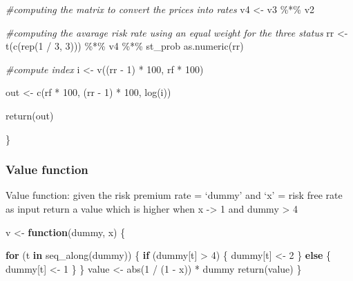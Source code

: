 \documentclass[
]{article}
\newenvironment{Shaded}{\begin{snugshade}}{\end{snugshade}}
\newcommand{\CommentTok}[1]{\textcolor[rgb]{0.56,0.35,0.01}{\textit{#1}}}
\newcommand{\ControlFlowTok}[1]{\textcolor[rgb]{0.13,0.29,0.53}{\textbf{#1}}}
\newcommand{\DecValTok}[1]{\textcolor[rgb]{0.00,0.00,0.81}{#1}}
\newcommand{\FunctionTok}[1]{\textcolor[rgb]{0.00,0.00,0.00}{#1}}
\newcommand{\NormalTok}[1]{#1}
\newcommand{\OtherTok}[1]{\textcolor[rgb]{0.56,0.35,0.01}{#1}}
\newcommand{\SpecialCharTok}[1]{\textcolor[rgb]{0.00,0.00,0.00}{#1}}
\begin{document}
\begin{Shaded}
\begin{Highlighting}[]
    \CommentTok{\#computing the matrix to convert the prices into rates}
\NormalTok{    v4      }\OtherTok{\textless{}{-}}\NormalTok{ v3 }\SpecialCharTok{\%*\%}\NormalTok{ v2}

    \CommentTok{\#computing the avarage risk rate using an equal weight for the three status}
\NormalTok{    rr      }\OtherTok{\textless{}{-}} \FunctionTok{t}\NormalTok{(}\FunctionTok{c}\NormalTok{(}\FunctionTok{rep}\NormalTok{(}\DecValTok{1} \SpecialCharTok{/} \DecValTok{3}\NormalTok{, }\DecValTok{3}\NormalTok{))) }\SpecialCharTok{\%*\%}\NormalTok{ v4 }\SpecialCharTok{\%*\%}\NormalTok{ st\_prob}
    \FunctionTok{as.numeric}\NormalTok{(rr)}

    \CommentTok{\#compute index}
\NormalTok{    i       }\OtherTok{\textless{}{-}} \FunctionTok{v}\NormalTok{((rr }\SpecialCharTok{{-}} \DecValTok{1}\NormalTok{) }\SpecialCharTok{*} \DecValTok{100}\NormalTok{, rf }\SpecialCharTok{*} \DecValTok{100}\NormalTok{)}

\NormalTok{    out     }\OtherTok{\textless{}{-}} \FunctionTok{c}\NormalTok{(rf }\SpecialCharTok{*} \DecValTok{100}\NormalTok{, (rr }\SpecialCharTok{{-}} \DecValTok{1}\NormalTok{) }\SpecialCharTok{*} \DecValTok{100}\NormalTok{, }\FunctionTok{log}\NormalTok{(i))}

    \FunctionTok{return}\NormalTok{(out)}

\NormalTok{\}}
\end{Highlighting}
\end{Shaded}

\hypertarget{value-function}{%
\subsubsection{Value function}\label{value-function}}

Value function: given the risk premium rate = `dummy' and `x' = risk
free rate as input return a value which is higher when x -\textgreater{}
1 and dummy \textgreater{} 4

\begin{Shaded}
\begin{Highlighting}[]
\NormalTok{v }\OtherTok{\textless{}{-}} \ControlFlowTok{function}\NormalTok{(dummy, x) \{}

  \ControlFlowTok{for}\NormalTok{ (t }\ControlFlowTok{in} \FunctionTok{seq\_along}\NormalTok{(dummy)) \{}
    \ControlFlowTok{if}\NormalTok{ (dummy[t] }\SpecialCharTok{\textgreater{}} \DecValTok{4}\NormalTok{) \{}
\NormalTok{      dummy[t]  }\OtherTok{\textless{}{-}}  \DecValTok{2}
\NormalTok{    \}}
    \ControlFlowTok{else}\NormalTok{ \{}
\NormalTok{      dummy[t]  }\OtherTok{\textless{}{-}}  \DecValTok{1}
\NormalTok{    \}}
\NormalTok{  \}}
\NormalTok{  value }\OtherTok{\textless{}{-}}  \FunctionTok{abs}\NormalTok{(}\DecValTok{1} \SpecialCharTok{/}\NormalTok{ (}\DecValTok{1} \SpecialCharTok{{-}}\NormalTok{ x)) }\SpecialCharTok{*}\NormalTok{ dummy}
  \FunctionTok{return}\NormalTok{(value)}
\NormalTok{\}}
\end{Highlighting}
\end{Shaded}
\end{document}

